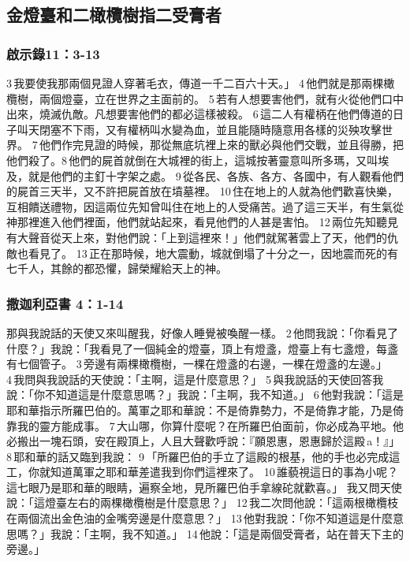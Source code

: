 \subsection{金燈臺和二橄欖樹指二受膏者}

\subsubsection{啟示錄11：3-13}
 3 我要使我那兩個見證人穿著毛衣，傳道一千二百六十天。」 4 他們就是那兩棵橄欖樹，兩個燈臺，立在世界之主面前的。 5 若有人想要害他們，就有火從他們口中出來，燒滅仇敵。凡想要害他們的都必這樣被殺。 6 這二人有權柄在他們傳道的日子叫天閉塞不下雨，又有權柄叫水變為血，並且能隨時隨意用各樣的災殃攻擊世界。 7 他們作完見證的時候，那從無底坑裡上來的獸必與他們交戰，並且得勝，把他們殺了。8 他們的屍首就倒在大城裡的街上，這城按著靈意叫所多瑪，又叫埃及，就是他們的主釘十字架之處。 9 從各民、各族、各方、各國中，有人觀看他們的屍首三天半，又不許把屍首放在墳墓裡。 10 住在地上的人就為他們歡喜快樂，互相饋送禮物，因這兩位先知曾叫住在地上的人受痛苦。過了這三天半，有生氣從神那裡進入他們裡面，他們就站起來，看見他們的人甚是害怕。 12 兩位先知聽見有大聲音從天上來，對他們說：「上到這裡來！」他們就駕著雲上了天，他們的仇敵也看見了。 13 正在那時候，地大震動，城就倒塌了十分之一，因地震而死的有七千人，其餘的都恐懼，歸榮耀給天上的神。

\subsubsection{撒迦利亞書 4：1-14}
那與我說話的天使又來叫醒我，好像人睡覺被喚醒一樣。 2 他問我說：「你看見了什麼？」我說：「我看見了一個純金的燈臺，頂上有燈盞，燈臺上有七盞燈，每盞有七個管子。 3 旁邊有兩棵橄欖樹，一棵在燈盞的右邊，一棵在燈盞的左邊。」 4 我問與我說話的天使說：「主啊，這是什麼意思？」 5 與我說話的天使回答我說：「你不知道這是什麼意思嗎？」我說：「主啊，我不知道。」 6 他對我說：「這是耶和華指示所羅巴伯的。萬軍之耶和華說：不是倚靠勢力，不是倚靠才能，乃是倚靠我的靈方能成事。 7 大山哪，你算什麼呢？在所羅巴伯面前，你必成為平地。他必搬出一塊石頭，安在殿頂上，人且大聲歡呼說：『願恩惠，恩惠歸於這殿 a！』」 8 耶和華的話又臨到我說： 9 「所羅巴伯的手立了這殿的根基，他的手也必完成這工，你就知道萬軍之耶和華差遣我到你們這裡來了。 10 誰藐視這日的事為小呢？這七眼乃是耶和華的眼睛，遍察全地，見所羅巴伯手拿線砣就歡喜。」
我又問天使說：「這燈臺左右的兩棵橄欖樹是什麼意思？」 12 我二次問他說：「這兩根橄欖枝在兩個流出金色油的金嘴旁邊是什麼意思？」 13 他對我說：「你不知道這是什麼意思嗎？」我說：「主啊，我不知道。」 14 他說：「這是兩個受膏者，站在普天下主的旁邊。」






